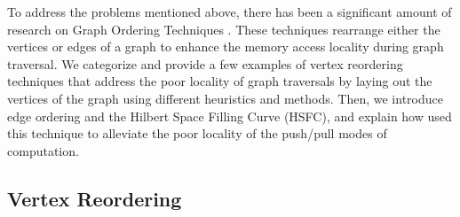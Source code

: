 To address the problems mentioned above, there has been a significant amount of research on Graph Ordering Techniques \cite{lwr, dbg, basc, iHTL, sapco, slashburn, cost}. These techniques rearrange either the vertices or edges of a graph to enhance the memory access locality during graph traversal. 
We categorize 
and provide a few examples 
of vertex reordering techniques that address the poor locality of graph traversals by laying out the vertices of the graph using different heuristics and methods. Then, we introduce edge ordering and the Hilbert Space Filling Curve (\ac{HSFC}), and explain how \citet{cost} used this technique to alleviate the poor locality of the push/pull modes of computation. 

\subsection{Vertex Reordering}\label{sec:vertex_reorderings}





